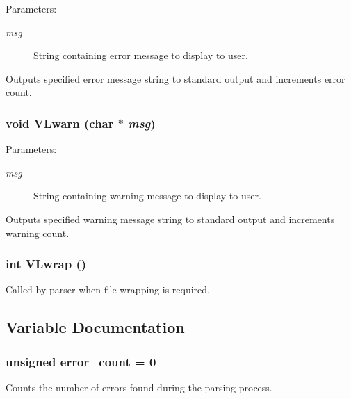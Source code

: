 \begin{Desc}
\item[Parameters:]
\begin{description}
\item[{\em msg}]String containing error message to display to user.\end{description}
\end{Desc}
Outputs specified error message string to standard output and increments error count. 
\subsubsection{\setlength{\rightskip}{0pt plus 5cm}void VLwarn (char $\ast$ {\em msg})}\label{parser__misc_8c_a4}


\begin{Desc}
\item[Parameters:]
\begin{description}
\item[{\em msg}]String containing warning message to display to user.\end{description}
\end{Desc}
Outputs specified warning message string to standard output and increments warning count. 
\subsubsection{\setlength{\rightskip}{0pt plus 5cm}int VLwrap ()}\label{parser__misc_8c_a5}


Called by parser when file wrapping is required. 

\subsection{Variable Documentation}
\subsubsection{\setlength{\rightskip}{0pt plus 5cm}unsigned {\bf error\_\-count} = 0}\label{parser__misc_8c_a1}


Counts the number of errors found during the parsing process. 
